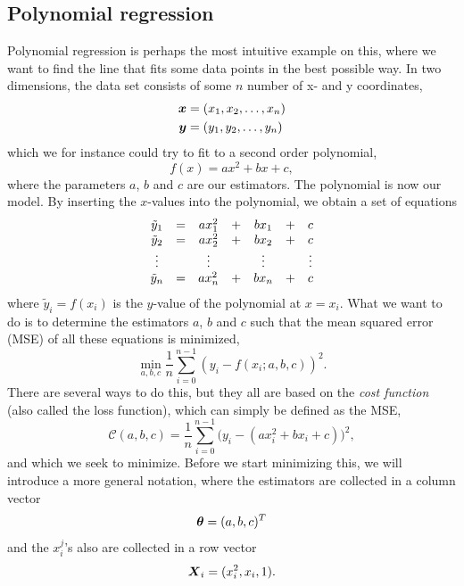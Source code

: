 \subsection{Polynomial regression}
Polynomial regression is perhaps the most intuitive example on this, where we want to find the line that fits some data points in the best possible way. In two dimensions, the data set consists of some $n$ number of x- and y coordinates,
\begin{align*}
\boldsymbol{{x}}&=(x_1,x_2,\hdots,x_n)\\
\boldsymbol{{y}}&=(y_1,y_2,\hdots,y_n)
\end{align*}
which we for instance could try to fit to a second order polynomial,
\begin{equation}
f(x)=ax^2+bx+c,
\end{equation}
where the parameters $a$, $b$ and $c$ are our estimators. The polynomial is now our model. By inserting the $x$-values into the polynomial, we obtain a set of equations
\begin{equation}
\mqty{
	\tilde{y}_1&=&ax_1^2&+&bx_1&+&c\\
	\tilde{y}_2&=&ax_2^2&+&bx_2&+&c\\
	\vdots&&\vdots&&\vdots&&\vdots\\
	\tilde{y}_n&=&ax_n^2&+&bx_n&+&c
}
\label{eq:lineareqs}
\end{equation}
where $\tilde{y}_i=f(x_i)$ is the $y$-value of the polynomial at $x=x_i$. What we want to do is to determine the estimators $a$, $b$ and $c$ such that the mean squared error (MSE) of all these equations is minimized,
\begin{equation}
\min_{a,b,c}\frac{1}{n}\sum_{i=0}^{n-1}(y_i-f(x_i;a,b,c))^2.
\end{equation}
There are several ways to do this, but they all are based on the \textit{cost function} (also called the loss function), which can simply be defined as the MSE,
\begin{equation}
\mathcal{C}(a,b,c)=\frac{1}{n}\sum_{i=0}^{n-1}\Big(y_i-(ax_i^2+bx_i+c)\Big)^2,
\end{equation}
and which we seek to minimize. Before we start minimizing this, we will introduce a more general notation, where the estimators are collected in a column vector 
\begin{equation*}
\boldsymbol{{\theta}}=(a,b,c)^T
\end{equation*}
and the $x_i^j$'s also are collected in a row vector
\begin{equation*}
\boldsymbol{{X}}_i=(x_i^2, x_i, 1).
\end{equation*}
